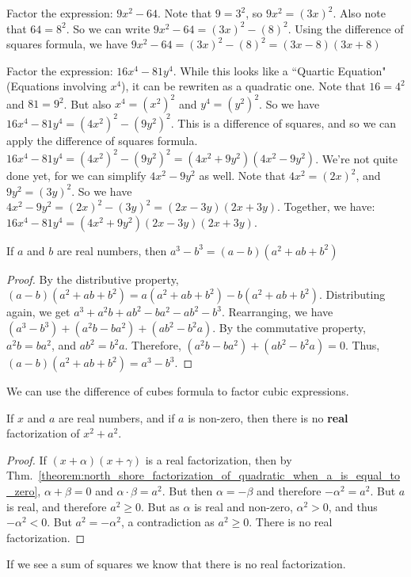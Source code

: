 \documentclass[crop=false,class=article,oneside]{standalone}
\begin{document}
        \begin{example}
        Factor the expression: $9x^{2}-64$. Note that $9=3^{2}$, so $9x^{2}=(3x)^{2}$. Also note that $64=8^{2}$. So we can write $9x^{2}-64=(3x)^{2}-(8)^{2}$. Using the difference of squares formula, we have $9x^{2}-64=(3x)^{2}-(8)^{2}=(3x-8)(3x+8)$
        \end{example}
        \begin{example}
        Factor the expression: $16x^{4}-81y^{4}$. While this looks like a ``Quartic Equation" (Equations involving $x^4$), it can be rewriten as a quadratic one. Note that $16=4^{2}$ and $81=9^{2}$. But also $x^{4}=(x^{2})^{2}$ and $y^{4}=(y^{2})^{2}$. So we have $16x^{4}-81y^{4}=(4x^{2})^{2}-(9y^{2})^{2}$. This is a difference of squares, and so we can apply the difference of squares formula. $16x^{4}-81y^{4}=(4x^{2})^{2}-(9y^{2})^{2}=(4x^{2}+9y^{2})(4x^{2}-9y^{2})$. We're not quite done yet, for we can simplify $4x^{2}-9y^{2}$ as well. Note that $4x^{2}=(2x)^{2}$, and $9y^{2}=(3y)^{2}$. So we have $4x^{2}-9y^{2}=(2x)^{2}-(3y)^{2}=(2x-3y)(2x+3y)$. Together, we have: $16x^{4}-81y^{4}=(4x^{2}+9y^{2})(2x-3y)(2x+3y)$.
        \end{example}
        \begin{theorem}
        \label{theorem:north_shore_difference_of_cubes}
        If $a$ and $b$ are real numbers, then $a^{3}-b^{3}=(a-b)(a^{2}+ab+b^{2})$
        \end{theorem}
        \begin{proof}
        By the distributive property, $(a-b)(a^{2}+ab+b^{2})=a(a^{2}+ab+b^{2})-b(a^{2}+ab+b^{2})$. Distributing again, we get $a^{3}+a^{2}b+ab^{2}-ba^{2}-ab^{2}-b^{3}$. Rearranging, we have $(a^{3}-b^{3})+(a^{2}b-ba^{2})+(ab^{2}-b^{2}a)$. By the commutative property, $a^{2}b=ba^{2}$, and $ab^{2}=b^{2}a$. Therefore, $(a^{2}b-ba^{2})+(ab^{2}-b^{2}a)=0$. Thus, $(a-b)(a^{2}+ab+b^{2})=a^{3}-b^{3}$.
        \end{proof}
        \begin{remark}
        We can use the difference of cubes formula to factor cubic expressions.
        \end{remark}
        \begin{theorem}
        \label{theorem:north_shore_sum_of_squares}
        If $x$ and $a$ are real numbers, and if $a$ is non-zero, then there is no \textbf{real} factorization of $x^{2}+a^{2}$.
        \end{theorem}
        \begin{proof}
        If $(x+\alpha)(x+\gamma)$ is a real factorization, then by Thm.~\ref{theorem:north_shore_factorization_of_quadratic_when_a_is_equal_to_zero}, $\alpha+\beta=0$ and $\alpha\cdot\beta=a^{2}$. But then $\alpha=-\beta$ and therefore $-\alpha^{2}=a^{2}$. But $a$ is real, and therefore $a^{2}\geq 0$. But as $\alpha$ is real and non-zero, $\alpha^{2}>0$, and thus $-\alpha^{2}<0$. But $a^{2}=-\alpha^{2}$, a contradiction as $a^{2}\geq 0$. There is no real factorization.
        \end{proof}
        \begin{remark}
        If we see a sum of squares we know that there is no real factorization.
        \end{remark}
\end{document}
